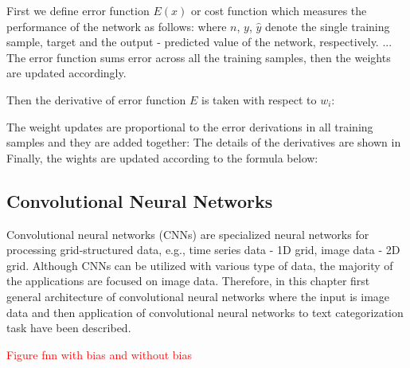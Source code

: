 First we define error function $E(x)$ or cost function which measures the performance of the network as follows:%
where $n$, $y$, $\hat{y}$ denote the single training sample, target and the output - predicted value of the network, respectively. ... The error function sums error across all the training samples, then the weights are updated accordingly. 

Then the derivative of error function $E$ is taken with respect to $w_i$:

The weight updates are proportional to the error derivations in all training samples and they are added together:
The details of the derivatives are shown in~\cite{}
Finally, the wights are updated according to the formula below:

\subsection{Convolutional Neural Networks}
Convolutional neural networks (CNNs) are specialized neural networks for processing grid-structured data, e.g., time series data - 1D grid, image data - 2D grid. Although CNNs can be utilized with various type of data, the majority of the applications are focused on image data. Therefore, in this chapter first general architecture of convolutional neural networks where the input is image data and then application of convolutional neural networks to text categorization task have been described. 

\textcolor{red}{Figure fnn with bias and without bias}

